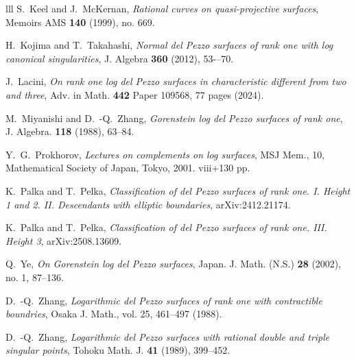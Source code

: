 \documentclass[10pt,oneside,reqno]{amsart}
\theoremstyle{definition}
\theoremstyle{remark}
\numberwithin{equation}{section}
\begin{document}
\begin{thebibliography}{lll}
S.~Keel and J.~McKernan, \emph{Rational curves on quasi-projective
surfaces}, Memoirs AMS \textbf{140} (1999), no. 669.

H.~Kojima and T.~Takahashi, \emph{Normal del Pezzo surfaces of rank one with log canonical
singularities}, J. Algebra \textbf{360} (2012), 53-–70.

J.~Lacini, \emph{On rank one log del Pezzo surfaces in characteristic different from two and three}, Adv. in Math. \textbf{442} Paper 109568, 77 pages  (2024).

M.~Miyanishi and D.~-Q.~Zhang, \emph{Gorenstein log del Pezzo surfaces of rank one}, J. Algebra. \textbf{118} (1988), 63--84.

Y.~G.~Prokhorov, \emph{Lectures on complements on log surfaces},
MSJ Mem., 10, Mathematical Society of Japan, Tokyo, 2001. viii+130 pp.

K.~Palka and T.~Pelka, \emph{Classification of del Pezzo surfaces of rank one. I. Height 1 and 2. II. Descendants with elliptic boundaries}, arXiv:2412.21174.

K.~Palka and T.~Pelka, \emph{Classification of del {P}ezzo surfaces of rank one. III. Height 3}, arXiv:2508.13609.

Q.~Ye, \emph{On Gorenstein log del Pezzo surfaces},  Japan. J. Math. (N.S.) \textbf{28} (2002), no. 1, 87--136.

D.~-Q.~Zhang, \emph{Logarithmic del Pezzo surfaces of rank one with contractible boundries},  Osaka J. Math., vol. 25, 461--497 (1988).

D.~-Q.~Zhang, \emph{Logarithmic del Pezzo surfaces with rational
double and triple singular points},
Tohoku Math. J. \textbf{41} (1989), 399--452.
\end{thebibliography}
\end{document}
